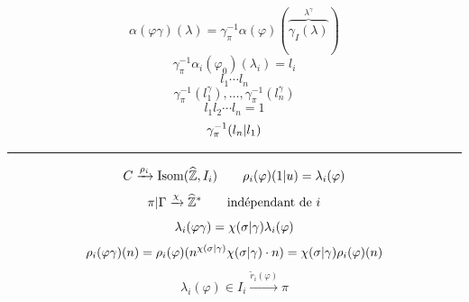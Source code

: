 \[
\alpha(\varphi\gamma)(\lambda)=\gamma_\pi^{-1}\alpha(\varphi)(\overbrace{\gamma_I(\lambda)}^{\lambda^\gamma})
\]
\[
\gamma_\pi^{-1}\alpha_i(\varphi_0)(\lambda_i)=l_i
\]
\[
l_1\cdots l_n
\]
\[
\gamma_\pi^{-1}(l_1^\gamma),\ldots,\gamma_\pi^{-1}(l_n^\gamma)
\]
\[
l_1l_2\cdots l_n=1
\]
\[
\gamma_\pi^{-1}(l_n|l_1)
\]
\par\noindent\rule{\linewidth}{0.3pt}
\[
C\xrightarrow{\rho_i}\operatorname{Isom}(\widehat{\mathbb Z},I_i)\qquad\rho_i(\varphi)(1|u)=\lambda_i(\varphi)
\]
\[
\pi|\Gamma\xrightarrow{\chi}\widehat{\mathbb Z}^{*}\qquad\text{indépendant de $i$}
\]
\[
\lambda_i(\varphi\gamma)=\chi(\sigma|\gamma)\lambda_i(\varphi)
\]
\[
\rho_i(\varphi\gamma)(n)=\rho_i(\varphi)(n^{\chi(\sigma|\gamma)}\chi(\sigma|\gamma)\cdot n)=\chi(\sigma|\gamma)\rho_i(\varphi)(n)
\]
\[
\lambda_i(\varphi)\in I_i\xrightarrow{\widetilde r_i(\varphi)}\pi
\]
